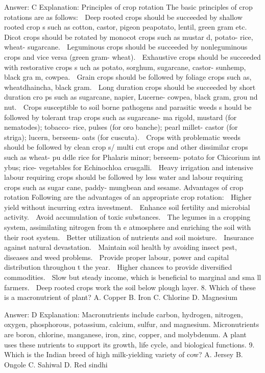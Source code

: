 Answer: C
Explanation: Principles of crop rotation The basic principles of crop rotations are as follows:  Deep rooted crops should be succeeded by shallow rooted crop s such as cotton, castor, pigeon peapotato, lentil, green gram etc.  Dicot crops should be rotated by monocot crops such as mustar d, potato- rice, wheat- sugarcane.  Leguminous crops should be succeeded by nonleguminous crops and vice versa (green gram- wheat).  Exhaustive crops should be succeeded with restorative crops s uch as potato, sorghum, sugarcane, castor- sunhemp, black gra m, cowpea.  Grain crops should be followed by foliage crops such as, wheatdhaincha, black gram.  Long duration crops should be succeeded by short duration cro ps such as sugarcane, napier, Lucerne- cowpea, black gram, grou nd nut.  Crops susceptible to soil borne pathogens and parasitic weeds s hould be followed by tolerant trap crops such as sugarcane- ma rigold, mustard (for nematodes); tobacco- rice, pulses (for oro banche); pearl millet- castor (for striga); lucern, berseem- oats (for cuscuta).  Crops with problematic weeds should be followed by clean crop s/ multi cut crops and other dissimilar crops such as wheat- pu ddle rice for Phalaris minor; berseem- potato for Chicorium int ybus; rice- vegetables for Echinochloa crusgalli.  Heavy irrigation and intensive labour requiring crops should be followed by less water and labour requiring crops such as sugar cane, paddy- mungbean and sesame. Advantages of crop rotation Following are the advantages of an appropriate crop rotation:  Higher yield without incurring extra investment.  Enhance soil fertility and microbial activity.  Avoid accumulation of toxic substances.  The legumes in a cropping system, assimilating nitrogen from th e atmosphere and enriching the soil with their root system.  Better utilization of nutrients and soil moisture.  Insurance against natural devastation.  Maintain soil health by avoiding insect pest, diseases and weed problems.  Provide proper labour, power and capital distribution throughou t the year.  Higher chances to provide diversified commodities.  Slow but steady income, which is beneficial to marginal and sma ll farmers.  Deep rooted crops work the soil below plough layer. 8. Which of these is a macronutrient of plant? A. Copper B. Iron C. Chlorine D. Magnesium 

Answer: D
Explanation: Macronutrients include carbon, hydrogen, nitrogen, oxygen, phosphorous, potassium, calcium, sulfur, and magnesium. Micronutrients are boron, chlorine, manganese, iron, zinc, copper, and molybdenum. A plant uses these nutrients to support its growth, life cycle, and biological functions. 9. Which is the Indian breed of high milk-yielding variety of cow? A. Jersey B. Ongole C. Sahiwal D. Red sindhi 

